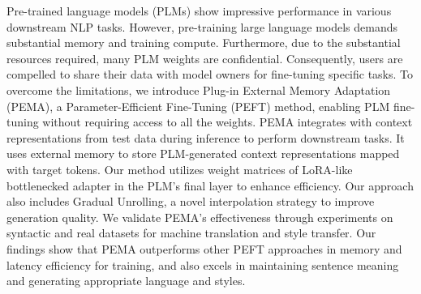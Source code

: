 Pre-trained language models (PLMs) show impressive performance in various downstream NLP tasks. However, pre-training large language models demands substantial memory and training compute. Furthermore, due to the substantial resources required, many PLM weights are confidential. Consequently, users are compelled to share their data with model owners for fine-tuning specific tasks. To overcome the limitations, we introduce Plug-in External Memory Adaptation (PEMA), a Parameter-Efficient Fine-Tuning (PEFT) method, enabling PLM fine-tuning without requiring access to all the weights. PEMA integrates with context representations from test data during inference to perform downstream tasks. It uses external memory to store PLM-generated context representations mapped with target tokens. Our method utilizes weight matrices of LoRA-like bottlenecked adapter in the PLM's final layer to enhance efficiency. Our approach also includes Gradual Unrolling, a novel interpolation strategy to improve generation quality. We validate PEMA's effectiveness through experiments on syntactic and real datasets for machine translation and style transfer. Our findings show that PEMA outperforms other PEFT approaches in memory and latency efficiency for training, and also excels in maintaining sentence meaning and generating appropriate language and styles.